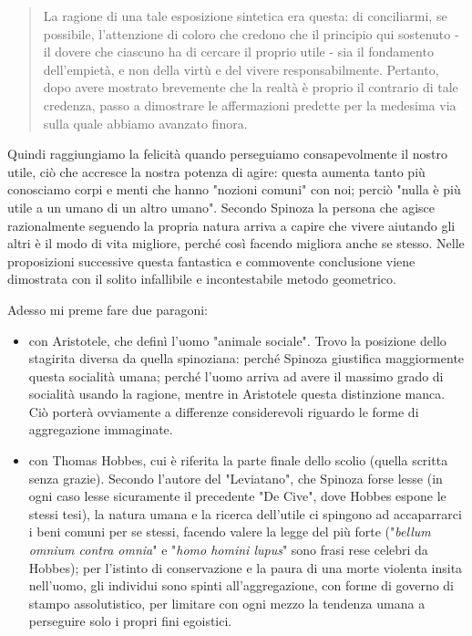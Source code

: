 \begin{quotation}
	\textsf{La ragione di una tale esposizione sintetica era questa: di conciliarmi, se possibile, l’attenzione di coloro che credono che il principio qui sostenuto - il dovere che ciascuno ha di cercare il proprio utile - sia il fondamento dell’empietà, e non della virtù e del
	vivere responsabilmente.} Pertanto, dopo avere mostrato brevemente che la realtà è proprio
	il contrario di tale credenza, passo a dimostrare le affermazioni predette per la medesima
	via sulla quale abbiamo avanzato finora.
\end{quotation}

Quindi raggiungiamo la felicità quando perseguiamo consapevolmente il nostro utile, ciò che accresce la nostra potenza di agire: questa aumenta tanto più conosciamo corpi e menti che hanno "nozioni comuni" con noi; perciò "nulla è più utile a un umano di un altro umano". Secondo Spinoza la persona che agisce razionalmente seguendo la propria natura arriva a capire che vivere aiutando gli altri è il modo di vita migliore, perché così facendo migliora anche se stesso. Nelle proposizioni successive questa fantastica e commovente conclusione viene dimostrata con il solito infallibile e incontestabile metodo geometrico. 

Adesso mi preme fare due paragoni:
\begin{itemize}
	\item con Aristotele, che definì l'uomo "animale sociale". Trovo la posizione dello stagirita diversa da quella spinoziana: perché Spinoza giustifica maggiormente questa socialità umana; perché l'uomo arriva ad avere il massimo grado di socialità usando la ragione, mentre in Aristotele questa distinzione manca. Ciò porterà ovviamente a differenze considerevoli riguardo le forme di aggregazione immaginate.
	\item con Thomas Hobbes, cui è riferita la parte finale dello scolio (quella scritta senza grazie). Secondo l'autore del "Leviatano", che Spinoza forse lesse (in ogni caso lesse sicuramente il precedente "De Cive", dove Hobbes espone le stessi tesi), la natura umana e la ricerca dell'utile ci spingono ad accaparrarci i beni comuni per se stessi, facendo valere la legge del più forte ("\textit{bellum omnium contra omnia}" e "\textit{homo homini lupus}" sono frasi rese celebri da Hobbes); per l'istinto di conservazione e la paura di una morte violenta insita nell'uomo, gli individui sono spinti all'aggregazione, con forme di governo di stampo assolutistico, per limitare con ogni mezzo la tendenza umana a perseguire solo i propri fini egoistici.
\end{itemize}

